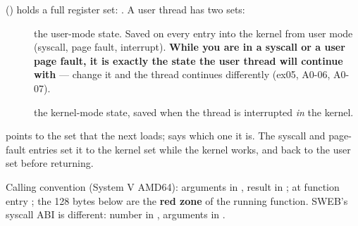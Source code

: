  () holds a full
register set: . A user thread has two sets:

\begin{description}
\item[] the user-mode state. Saved on every entry into the kernel
  from user mode (syscall, page fault, interrupt). \textbf{While you are in a syscall or a
  user page fault, it is exactly the state the user thread will continue with} ---
  change it and the thread continues differently (ex05, A0-06, A0-07).
\item[] the kernel-mode state, saved when the thread is
  interrupted \emph{in} the kernel.
\end{description}

 points to the set that the next 
loads;  says which one it is. The syscall and page-fault
entries set it to the kernel set while the kernel works, and back to the user set before
returning.

Calling convention (System V AMD64): arguments in , result
in ; at function entry ; the 128 bytes below  are the
\textbf{red zone} of the running function. SWEB's syscall ABI is different: number in
, arguments in .

